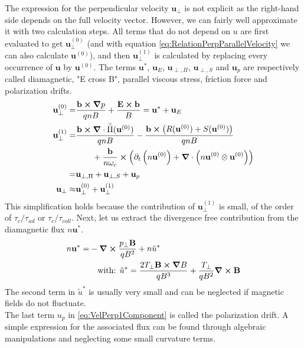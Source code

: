 The expression for the perpendicular velocity $\mathbf{u}_\perp$ is not explicit as the right-hand side depends on the full velocity vector. However, we can fairly well approximate it with two calculation steps. All terms that do not depend on $u$ are first evaluated to get $\mathbf{u}_\perp^{(0)}$ (and with equation \ref{eq:RelationPerpParallelVelocity} we can also calculate $\mathbf{u}^{(0)}$), and then $\mathbf{u}_\perp^{(1)}$ is calculated by replacing every occurrence of $\mathbf{u}$ by $\mathbf{u}^{(0)}$. The terms $\mathbf{u}^*$, $\mathbf{u}_E$, $\mathbf{u}_{\perp,\Pi}$, $\mathbf{u}_{\perp,S}$ and $\mathbf{u}_{p}$ are respectively called diamagnetic, "E cross B", parallel viscous stress, friction force and polarization drifts.
\begin{align}
	\mathbf{u}_\perp^{(0)} =& \frac{\mathbf{b}\cross\grad p}{qnB} + \frac{\mathbf{E}\cross\mathbf{b}}{B} = \mathbf{u}^* + \mathbf{u}_E \label{eq:VelPerp0Component} \\	
	\mathbf{u}_\perp^{(1)} =& \frac{\mathbf{b}\cross\grad\cdot\bar{\bar{\Pi}}(\mathbf{u}^{(0)})}{qnB} - \frac{\mathbf{b}\cross\left(R(\mathbf{u}^{(0)})+S(\mathbf{u}^{(0)})\right)}{qnB} \nonumber\\ & \qquad + \frac{\mathbf{b}}{n\omega_c} \cross \left(\partial_t \left(n\mathbf{u}^{(0)}\right) + \grad\cdot\left(n\mathbf{u}^{(0)}\otimes\mathbf{u}^{(0)}\right)\right) \nonumber \\
	=& \mathbf{u}_{\perp,\Pi} + \mathbf{u}_{\perp,S} + \mathbf{u}_{p} \label{eq:VelPerp1Component} \\
	\mathbf{u}_\perp \approx& \mathbf{u}_\perp^{(0)} + \mathbf{u}_\perp^{(1)}
\end{align}
This simplification holds because the contribution of $\mathbf{u}_\perp^{(1)}$ is small, of the order of $\tau_c / \tau_{ad}$ or $\tau_c / \tau_{coll}$. Next, let us extract the divergence free contribution from the diamagnetic flux $n\mathbf{u}^*$.
\begin{align}
	\label{eq:definitionDiamagneticDrift}
	n\mathbf{u}^* =& -\grad \cross \frac{p_\perp\mathbf{B}}{qB^2} + n\tilde{u}^* \nonumber\\
	& \quad\text{with: } \tilde{u}^* = \frac{2T_\perp\mathbf{B}\cross\grad B}{qB^3} + \frac{T_\perp}{qB^2}\grad\cross\mathbf{B}
\end{align}
The second term in $\tilde{u}^*$ is usually very small and can be neglected if magnetic fields do not fluctuate. \\
The last term $u_{p}$ in \autoref{eq:VelPerp1Component} is called the polarization drift. A simple expression for the associated flux can be found through algebraic manipulations and neglecting some small curvature terms.

